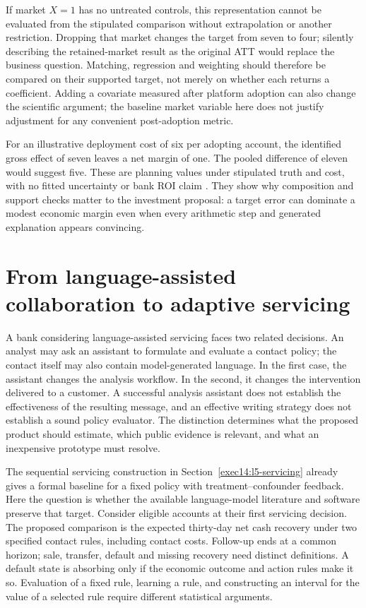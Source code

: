 If market $X=1$ has no untreated controls, this representation cannot be
evaluated from the stipulated comparison without extrapolation or another
restriction. Dropping that market changes the target from seven to four;
silently describing the retained-market result as the original ATT would
replace the business question. Matching, regression and weighting should
therefore be compared on their supported target, not merely on whether each
returns a coefficient. Adding a covariate measured after platform adoption
can also change the scientific argument; the baseline market variable here
does not justify adjustment for any convenient post-adoption metric.

For an illustrative deployment cost of six per adopting account, the
identified gross effect of seven leaves a net margin of one. The pooled
difference of eleven would suggest five. These are planning values under
stipulated truth and cost, with no fitted uncertainty or bank ROI claim
\cite{exec14_workflow_remainder}. They show why composition and support checks
matter to the investment proposal: a target error can dominate a modest
economic margin even when every arithmetic step and generated explanation
appears convincing.
\label{exec14:l5-depth-end}


\section{From language-assisted collaboration to adaptive servicing}
\label{exec16:longitudinal-policy}

A bank considering language-assisted servicing faces two related decisions.
An analyst may ask an assistant to formulate and evaluate a contact policy;
the contact itself may also contain model-generated language. In the first
case, the assistant changes the analysis workflow. In the second, it changes
the intervention delivered to a customer. A successful analysis assistant
does not establish the effectiveness of the resulting message, and an
effective writing strategy does not establish a sound policy evaluator.
The distinction determines what the proposed product should estimate, which
public evidence is relevant, and what an inexpensive prototype must resolve.

The sequential servicing construction in
Section~\ref{exec14:l5-servicing} already gives a formal baseline for a
fixed policy with treatment--confounder feedback.
Here the question is whether the available language-model literature and
software preserve that target. Consider eligible accounts at their first
servicing decision. The proposed comparison is the expected thirty-day net
cash recovery under two specified contact rules, including contact costs.
Follow-up ends at a common horizon; sale, transfer, default and missing
recovery need distinct definitions. A default state is absorbing only if
the economic outcome and action rules make it so. Evaluation of a fixed
rule, learning a rule, and constructing an interval for the value of a
selected rule require different statistical arguments.

